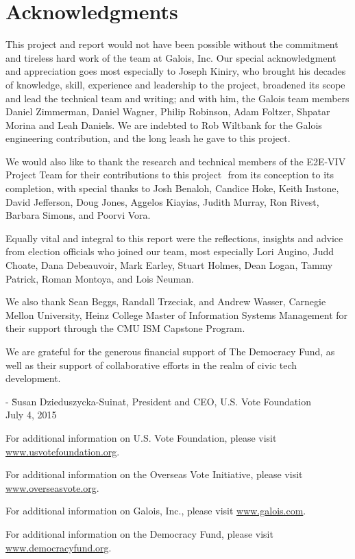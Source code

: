 \chapter*{Acknowledgments}
\label{chapter:acknowledgments}

This project and report would not have been possible without the
commitment and tireless hard work of the team at Galois, Inc. Our
special acknowledgment and appreciation goes most especially to
Joseph Kiniry, who brought his decades of knowledge, skill, experience
and leadership to the project, broadened its scope and lead the
technical team and writing; and with him, the Galois team members
Daniel Zimmerman, Daniel Wagner, Philip Robinson, Adam Foltzer,
Shpatar Morina and Leah Daniels. We are indebted to Rob Wiltbank for
the Galois engineering contribution, and the long leash he gave to
this project. 

We would also like to thank the research and technical members of the
E2E-VIV Project Team for their contributions to this project  from its
conception to its completion, with special thanks to Josh Benaloh,
Candice Hoke, Keith Instone, David Jefferson, Doug Jones, Aggelos
Kiayias, Judith Murray, Ron Rivest, Barbara Simons, and Poorvi Vora. 

Equally vital and integral to this report were the reflections,
insights and advice from election officials who joined our team, most
especially Lori Augino, Judd Choate, Dana Debeauvoir, Mark Earley,
Stuart Holmes, Dean Logan, Tammy Patrick, Roman Montoya, and Lois
Neuman.

We also thank Sean Beggs, Randall Trzeciak, and Andrew Wasser,
Carnegie Mellon University, Heinz College Master of Information
Systems Management for their support through the CMU ISM Capstone
Program. 

We are grateful for the generous financial support of The Democracy
Fund, as well as their support of collaborative efforts in the realm
of civic tech development. 

\begin{tabbing}
- \= Susan Dzieduszycka-Suinat, President and CEO, U.S. Vote
Foundation \\
\> July 4, 2015
\end{tabbing}

\vspace{\fill}

For additional information on U.S. Vote Foundation, please visit
\url{www.usvotefoundation.org}.   

For additional information on the Overseas Vote Initiative, please
visit \url{www.overseasvote.org}. 

For additional information on Galois, Inc., please visit
\url{www.galois.com}.

For additional information on the Democracy Fund, please visit
\url{www.democracyfund.org}.

